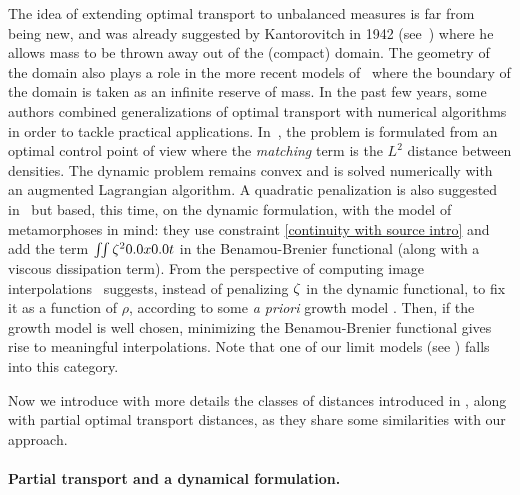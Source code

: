 The idea of extending optimal transport to unbalanced measures is far from being new, and was already suggested by Kantorovitch in 1942 (see~\cite{guittet2002extended}) where he allows mass to be thrown away out of the (compact) domain. The geometry of the domain also plays a role in the more recent models of~\cite{figalli2010new} where the boundary of the domain is taken as an infinite reserve of mass. In the past few years, some authors combined generalizations of optimal transport with numerical algorithms in order to tackle practical applications. In~\cite{benamou2003numerical}, the problem is formulated from an optimal control point of view where the \emph{matching} term is the $L^2$ distance between densities. The dynamic problem remains convex and is solved numerically with an augmented Lagrangian algorithm.
A quadratic penalization is also suggested in~\cite{OTmaasrumpf} but based, this time, on the dynamic formulation, with the model of metamorphoses \cite{Metamorphosis2005} in mind: they use constraint  \eqref{continuity with source intro} and add the term $\iint \Z^2 \d x \d t$ in the Benamou-Brenier functional (along with a viscous dissipation term). 
From the perspective of computing image interpolations~\cite{lombardi2013eulerian} suggests, instead of penalizing $\zeta$ in the dynamic functional, to fix it as a function of $\rho$, according to some \emph{a priori} growth model . Then, if the growth model is well chosen, minimizing the Benamou-Brenier functional gives rise to meaningful interpolations. Note that one of our limit models (see ) falls into this category.


Now we introduce with more details the classes of distances introduced in \cite{piccoli2014generalized, piccoli2013properties}, along with partial optimal transport distances, as they share some similarities with our approach.

\paragraph{Partial transport and a dynamical formulation.}

